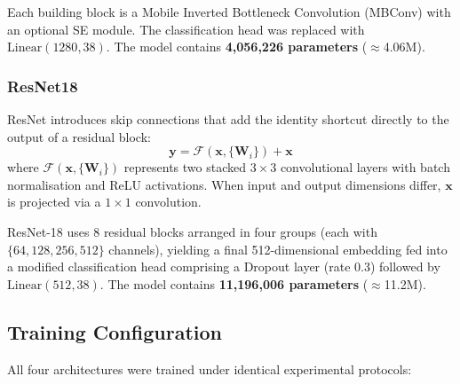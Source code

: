 \documentclass[pdflatex,sn-mathphys-num]{sn-jnl}
\begin{document}
Each building block is a Mobile Inverted Bottleneck Convolution (MBConv) with an
optional SE module. The classification head was replaced with
$\text{Linear}(1280, 38)$. The model contains \textbf{4{,}056{,}226 parameters}
($\approx$4.06M).

\subsubsection{ResNet18}

ResNet \citep{he2016resnet} introduces skip connections that add the identity shortcut
directly to the output of a residual block:
\begin{equation}
  \mathbf{y} = \mathcal{F}(\mathbf{x}, \{\mathbf{W}_i\}) + \mathbf{x}
  \label{eq:residual}
\end{equation}
where $\mathcal{F}(\mathbf{x}, \{\mathbf{W}_i\})$ represents two stacked
$3\times3$ convolutional layers with batch normalisation and ReLU activations. When
input and output dimensions differ, $\mathbf{x}$ is projected via a $1\times1$
convolution.

ResNet-18 uses 8 residual blocks arranged in four groups (each with $\{64, 128, 256,
512\}$ channels), yielding a final 512-dimensional embedding fed into a modified
classification head comprising a Dropout layer (rate 0.3) followed by
$\text{Linear}(512, 38)$. The model contains \textbf{11{,}196{,}006 parameters}
($\approx$11.2M).

\subsection{Training Configuration}
\label{sec:training_config}

All four architectures were trained under identical experimental protocols:
\end{document}
